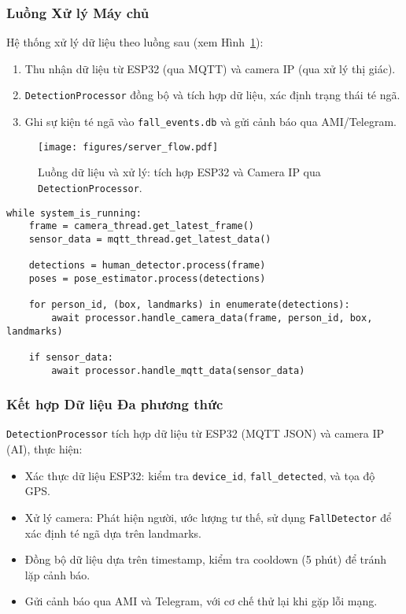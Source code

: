 \subsubsection{Luồng Xử lý Máy chủ}
\label{subsubsec:server_flow}

Hệ thống xử lý dữ liệu theo luồng sau (xem Hình~\ref{fig:server_flow}):
\begin{enumerate}
    \item Thu nhận dữ liệu từ ESP32 (qua MQTT) và camera IP (qua xử lý thị giác).
    \item \texttt{DetectionProcessor} đồng bộ và tích hợp dữ liệu, xác định trạng thái té ngã.
    \item Ghi sự kiện té ngã vào \texttt{fall\_events.db} và gửi cảnh báo qua AMI/Telegram.
\end{enumerate}

\begin{figure}[H]
\centering
\texttt{[image: figures/server\_flow.pdf]}
\caption{Luồng dữ liệu và xử lý: tích hợp ESP32 và Camera IP qua \texttt{DetectionProcessor}.}
\label{fig:server_flow}
\end{figure}

\begin{verbatim}
while system_is_running:
    frame = camera_thread.get_latest_frame()
    sensor_data = mqtt_thread.get_latest_data()
    
    detections = human_detector.process(frame)
    poses = pose_estimator.process(detections)
    
    for person_id, (box, landmarks) in enumerate(detections):
        await processor.handle_camera_data(frame, person_id, box, landmarks)
    
    if sensor_data:
        await processor.handle_mqtt_data(sensor_data)
\end{verbatim}

\subsubsection{Kết hợp Dữ liệu Đa phương thức}
\label{subsubsec:multi_input_fusion}

\texttt{DetectionProcessor} tích hợp dữ liệu từ ESP32 (MQTT JSON) và camera IP (AI), thực hiện:
\begin{itemize}
    \item Xác thực dữ liệu ESP32: kiểm tra \texttt{device\_id}, \texttt{fall\_detected}, và tọa độ GPS.
    \item Xử lý camera: Phát hiện người, ước lượng tư thế, sử dụng \texttt{FallDetector} để xác định té ngã dựa trên landmarks.
    \item Đồng bộ dữ liệu dựa trên timestamp, kiểm tra cooldown (5 phút) để tránh lặp cảnh báo.
    \item Gửi cảnh báo qua AMI và Telegram, với cơ chế thử lại khi gặp lỗi mạng.
\end{itemize}

